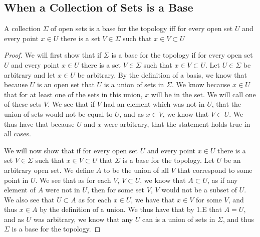 \subsection{When a Collection of Sets is a Base}
\begin{majorEx}
  A collection $\Sigma$ of open sets is a base for the topology iff for
  every open set $U$ and every point $x\in U$  
there is a set $V \in
  \Sigma$ such that $x \in V \subset U$
\end{majorEx}
\begin{proof}
We will first show that if $\Sigma$ is a base for the  topology if for
every open set $U$ and every point $x \in U$ there is a set $V \in
\Sigma$ such that $x \in V \subset U$. Let $U\in \Sigma$ be arbitrary
and let $x\in U$ be arbitrary. By the definition of a basis, we know
that because $U$ is an open set that $U$ is a union of sets in $\Sigma
$. We know because $x \in U$ that for at least one of the sets in this
union, $x$ will be in the set. We will call one of these sets $V$.
We see that if $V$ had an
element which was not in $U$, that the union of sets would not be
equal to $U$, and as $x\in V$, we know that $V\subset U$. We thus have
that because $U$ and $x$ were arbitrary, that the statement holds true
in all cases.

We will now show that if for every open set $U$ and every point $x\in U$  
there is a set $V \in \Sigma$ such that $x \in V \subset U$ that
$\Sigma$ is a base for the topology. Let $U$ be an arbitrary open
set. We define $A$ to be the union of all $V$ that correspond to some
point in $U$. We see that as for each $V$, $V \subset U$, we know that
$A \subset U$, as if any element of $A$ were not in $U$, then for some
set $V$, $V$ would not be a subset of $U$. We also see that $U\subset
A$ as for each $x\in U$, we have that $x\in V$ for some $V$, and thus
$x\in A$ by the definition of a union. We thus have that by 1.E that
$A= U$, and as $U$ was arbitrary, we know that any $U$ can is a union
of sets in $\Sigma$, and thus $\Sigma$ is a base for the topology.
\end{proof}